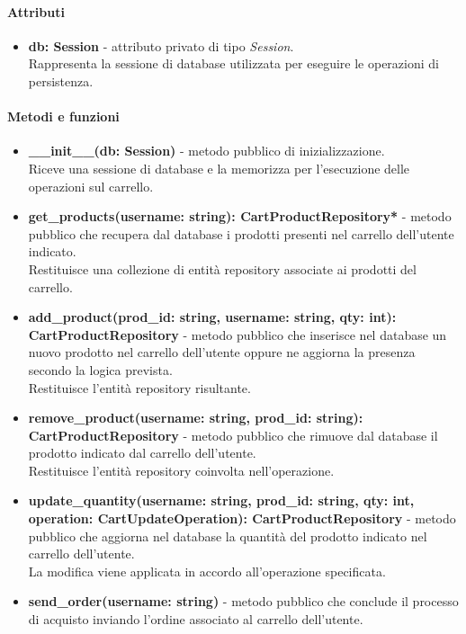 \paragraph{Attributi}
\begin{itemize}
	\item \textbf{db: Session} - attributo privato di tipo \textit{Session}.\\
	Rappresenta la sessione di database utilizzata per eseguire le operazioni di persistenza.
\end{itemize}

\paragraph{Metodi e funzioni}
\begin{itemize}
	\item \textbf{\_\_init\_\_(db: Session)} - metodo pubblico di inizializzazione.\\
	Riceve una sessione di database e la memorizza per l'esecuzione delle operazioni sul carrello.
	\item \textbf{get\_products(username: string): CartProductRepository*} - metodo pubblico che recupera dal database i prodotti presenti nel carrello dell'utente indicato.\\
	Restituisce una collezione di entit\`a repository associate ai prodotti del carrello.
	\item \textbf{add\_product(prod\_id: string, username: string, qty: int): CartProductRepository} - metodo pubblico che inserisce nel database un nuovo prodotto nel carrello dell'utente oppure ne aggiorna la presenza secondo la logica prevista.\\
	Restituisce l'entit\`a repository risultante.
	\item \textbf{remove\_product(username: string, prod\_id: string): CartProductRepository} - metodo pubblico che rimuove dal database il prodotto indicato dal carrello dell'utente.\\
	Restituisce l'entit\`a repository coinvolta nell'operazione.
	\item \textbf{update\_quantity(username: string, prod\_id: string, qty: int, operation: CartUpdateOperation): CartProductRepository} - metodo pubblico che aggiorna nel database la quantit\`a del prodotto indicato nel carrello dell'utente.\\
	La modifica viene applicata in accordo all'operazione specificata.
	\item \textbf{send\_order(username: string)} - metodo pubblico che conclude il processo di acquisto inviando l'ordine associato al carrello dell'utente.
\end{itemize}

